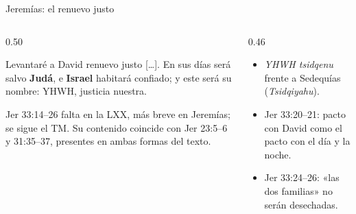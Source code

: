 \begin{frame}{Jeremías: el renuevo justo}
\begin{columns}[T,onlytextwidth]
\begin{column}{0.50\textwidth}
\par\smallskip
\begin{cita}Levantaré a David renuevo justo [\ldots]. En sus días será salvo \textbf{Judá}, e \textbf{Israel} habitará confiado; y este será su nombre: YHWH, justicia nuestra.\end{cita}
\begin{notalam}[Texto]
Jer 33:14--26 falta en la LXX, más breve en Jeremías; se sigue el TM. Su contenido coincide con Jer 23:5--6 y 31:35--37, presentes en ambas formas del texto.
\end{notalam}
\end{column}
\begin{column}{0.46\textwidth}\centering
{}
\elabpropia
\vspace{2pt}
\footnotesize
\begin{itemize}
\item \emph{YHWH tsidqenu} frente a Sedequías (\emph{Tsidqiyahu}).
\item Jer 33:20--21: pacto con David como el pacto con el día y la noche.
\item Jer 33:24--26: «las dos familias» no serán desechadas.
\end{itemize}
\end{column}
\end{columns}
\end{frame}

